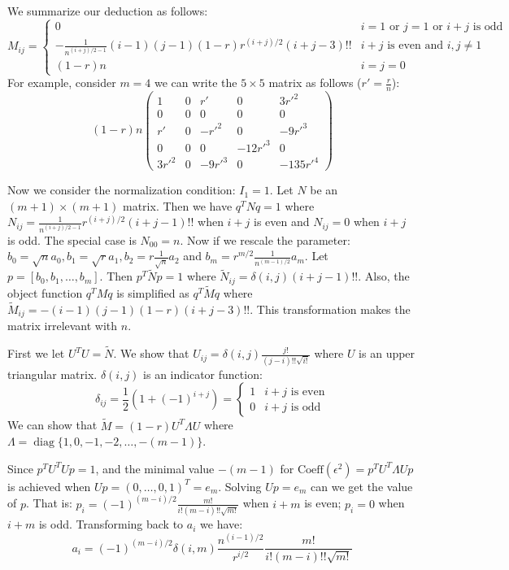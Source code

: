 \documentclass{article}
\DeclareMathOperator*{\diag}{diag}
\begin{document}
We summarize our deduction as follows:
\begin{equation}
M_{ij} = \begin{cases} 0 & i=1 \textrm{ or } j=1 \textrm{ or } i + j
\textrm{ is odd} \\
 -\frac{1}{n^{(i+j)/2-1}}(i-1)(j-1) (1-r)r^{(i+j)/ 2 } (i+j-3)!! & i+j
 \textrm{ is even and } i,j \neq 1 \\
(1-r)n & i=j=0
\end{cases}
\end{equation}
For example, consider $m = 4$
we can write the $ 5 \times 5 $ matrix as follows ($r'=\frac{r}{n}$):
$$
(1-r)n\begin{pmatrix}
1 & 0 & r'  & 0 & 3r'^2\\
0 & 0 & 0  & 0 & 0\\
r' &  0 & - r'^2 & 0 & -9 r'^3 \\
0 & 0 & 0 & -12r'^3 & 0 \\
3r'^2 & 0 & -9 r'^3 & 0 & -135r'^4
\end{pmatrix}
$$

Now we consider the normalization condition: $I_1 = 1$.
Let $N$ be an $(m+1) \times (m+1)$ matrix.
Then we have $q^T N q = 1$ where
$N_{ij} =\frac{1}{n^{(i+j)/2-1}}r^{(i+j) / 2} (i+j -1)!!$
when $i+j$ is even and $N_{ij} = 0$
when $i+j$ is odd.
The special case is $N_{00} = n$.
Now if we rescale the parameter:
$b_0 =  \sqrt{n}a_0, b_1 = \sqrt{r} a_1, b_2 = r \frac{1}{\sqrt{n}}a_2$
and $b_m = r^{m/2} \frac{1}{n^{(m-1)/2}}a_m$.
Let $p = [b_0, b_1, \dots, b_m]$.
Then $p^T \widetilde{N} p =1$ where
$\widetilde{N}_{ij} = \delta(i,j) (i+j -1)!!$.
Also, the object function $q^T M q$ is simplified as $q^T \widetilde{M} q$
where $\widetilde{M}_{ij} =  -(i-1)(j-1)(1-r) (i+j-3)!! $.
This transformation makes the matrix irrelevant with $n$.

First we let $U^T U = \widetilde{N}$.
We show that $U_{ij} = \delta(i,j)\frac{j!}{(j-i)!!\sqrt{i!}}$
where $U$ is an upper triangular matrix.
$\delta(i,j)$ is an indicator function:
\begin{equation}
\delta_{ij} = \frac{1}{2}(1+(-1)^{i+j})=\begin{cases}
1 & i+j \textrm{ is even} \\
0 & i+j \textrm{ is odd}
\end{cases}
\end{equation}
We can show that $\widetilde{M} = (1-r)U^T \Lambda U$ where
$\Lambda = \diag\{1,0, -1, -2, \dots, -(m-1)\}$.

Since $p^T U^T U p = 1$, and the minimal value $-(m-1)$ for
$\textrm{Coeff}(\epsilon^2) = p^T U^T \Lambda U p $ is achieved
when $U p = (0, \dots, 0, 1)^T = e_m$.
Solving $ U p = e_m $ can we get the value of $p$.
That is: $p_i = (-1)^{(m-i)/2} \frac{m!}{i!(m-i)!! \sqrt{m!}} $
when $i+m$ is even; $p_i = 0 $ when $i+m$ is odd.
Transforming back to $a_i$ we have:
\begin{equation}
a_i =(-1)^{(m-i)/2} \delta(i,m) \frac{n^{(i-1)/2}}{r^{i/2}}
\frac{m!}{i!(m-i)!! \sqrt{m!}}
\end{equation}
\end{document}
